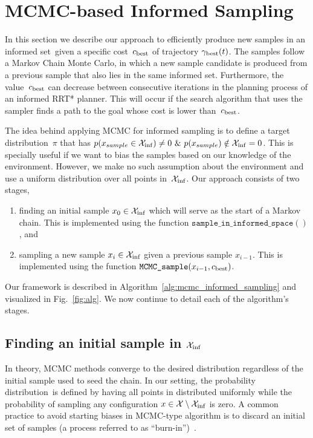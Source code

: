 \documentclass[letterpaper, 10 pt, conference]{ieeeconf}  %
\begin{document}
\section{MCMC-based Informed Sampling}
\label{sec:algorithm}

In this section we describe our approach to efficiently produce new samples in an informed set~\Cinf given a specific cost~$c_{\rm best}$ of trajectory $\gamma_{\rm best}(t)$.
The samples follow a Markov Chain Monte Carlo, in which a new sample candidate is produced from a previous sample that also lies in the same informed set.
Furthermore, the value~$c_{\rm best}$ can decrease between consecutive iterations in the planning process of an informed RRT* planner.
This will occur if the search algorithm that uses the sampler finds a path to the goal whose cost is lower than~$c_{\rm best}$.

The idea behind applying MCMC for informed sampling is to define a target distribution~$ \pi $ that has $p(x_{sample}\in\mathcal{X}_{\rm {inf}}) \ne 0 ~\&~ p(x_{sample})\notin\mathcal{X}_{\rm {inf}} = 0$. 
This is specially useful if we want to bias the samples based on our knowledge of the environment.
However, we make no such assumption about the environment and use a uniform distribution over all points in~$ \mathcal{X}_{\rm {inf}} $. 
Our approach consists of two stages,
\begin{enumerate}
	\item finding an initial sample $ x_0 \in \mathcal{X}_{\rm {inf}} $ which will serve as the start of a Markov chain. 
	This is implemented using the function 
	$ \texttt{sample\_in\_informed\_space}( )$, and
	\item sampling a new sample $ x_i \in \mathcal{X}_{\rm {inf}} $ given a previous sample $ x_{i-1} $. 
	This is implemented using the function $\texttt{MCMC\_sample} (x_{i-1}, c_{\rm best})$.
\end{enumerate}
Our framework is described in Algorithm~\ref{alg:mcmc_informed_sampling} and visualized in Fig.~\ref{fig:alg}.
We now continue to detail each of the algorithm's stages.

\subsection{Finding an initial sample in $\mathcal{X}_{\rm {inf}}$}
In theory, MCMC methods converge to the desired distribution regardless of the initial sample used to seed the chain.
In our setting, the probability distribution~\Pinf is defined by having all points in \Cinf distributed uniformly
while 
the probability of sampling any configuration $x \in \mathcal{X} \setminus \mathcal{X}_{\rm {inf}}$ is zero.
A common practice to avoid starting biases in MCMC-type algorithm is to discard an initial set of samples (a process referred to as ``burn-in'')~\cite{ADDJ03}. 
\end{document}
